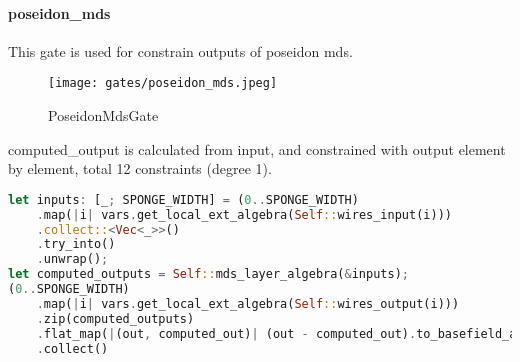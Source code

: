 \paragraph{poseidon\_mds}

This gate is used for constrain outputs of poseidon mds.

\begin{figure}[!ht]
    \centering
    \texttt{[image: gates/poseidon\_mds.jpeg]}
    \caption{PoseidonMdsGate}
    \label{fig:poseidon-mds}
\end{figure}

computed\_output is calculated from input, and constrained with output element by element, total 12 constraints (degree 1).
\begin{lstlisting}[language=rust]
let inputs: [_; SPONGE_WIDTH] = (0..SPONGE_WIDTH)
    .map(|i| vars.get_local_ext_algebra(Self::wires_input(i)))
    .collect::<Vec<_>>()
    .try_into()
    .unwrap();
let computed_outputs = Self::mds_layer_algebra(&inputs);
(0..SPONGE_WIDTH)
    .map(|i| vars.get_local_ext_algebra(Self::wires_output(i)))
    .zip(computed_outputs)
    .flat_map(|(out, computed_out)| (out - computed_out).to_basefield_array())
    .collect()
\end{lstlisting}
